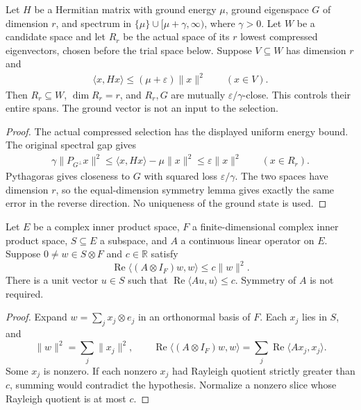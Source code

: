\begin{lemma}
    \label{lem:ritz_ground_space_accuracy}
    \leanok
    Let $H$ be a Hermitian matrix with ground energy $\mu$, ground
    eigenspace $G$ of dimension $r$, and spectrum in
    $\{\mu\}\cup[\mu+\gamma,\infty)$, where $\gamma>0$.
    Let $W$ be a candidate space and let $R_r$ be the actual space of
    its $r$ lowest compressed eigenvectors, chosen before the trial
    space below. Suppose $V\subseteq W$ has dimension $r$ and
    \begin{align}
        \langle x,Hx\rangle\le(\mu+\varepsilon)\|x\|^2
        \qquad(x\in V).
    \end{align}
    Then $R_r\subseteq W$, $\dim R_r=r$, and $R_r,G$ are mutually
    $\varepsilon/\gamma$-close. This controls their entire spans.
    The ground vector is not an input to the selection.
\end{lemma}
\begin{proof}\leanok
    The actual compressed selection has the displayed uniform energy bound.
    The original spectral gap gives
    \begin{align}
        \gamma\|P_{G^\perp}x\|^2
        \le\langle x,Hx\rangle-\mu\|x\|^2
        \le\varepsilon\|x\|^2 \qquad(x\in R_r).
    \end{align}
    Pythagoras gives closeness to $G$ with squared loss
    $\varepsilon/\gamma$. The two spaces have dimension $r$, so the
    equal-dimension symmetry lemma gives exactly the same error in the
    reverse direction. No uniqueness of the ground state is used.
\end{proof}


\begin{lemma}
    \label{lem:tensor_local_energy_witness}
    \leanok
    Let $E$ be a complex inner product space, $F$ a finite-dimensional
    complex inner product space, $S\subseteq E$ a subspace, and $A$ a
    continuous linear operator on $E$. Suppose $0\ne w\in S\otimes F$
    and $c\in\mathbb R$ satisfy
    \[
        \operatorname{Re}\langle(A\otimes I_F)w,w\rangle
        \le c\|w\|^2.
    \]
    There is a unit vector $u\in S$ such that
    $\operatorname{Re}\langle Au,u\rangle\le c$.
    Symmetry of $A$ is not required.
\end{lemma}
\begin{proof}\leanok
    Expand $w=\sum_jx_j\otimes e_j$ in an orthonormal basis of $F$.
    Each $x_j$ lies in $S$, and
    \[
        \|w\|^2=\sum_j\|x_j\|^2,\qquad
        \operatorname{Re}\langle(A\otimes I_F)w,w\rangle
        =\sum_j\operatorname{Re}\langle Ax_j,x_j\rangle.
    \]
    Some $x_j$ is nonzero. If each nonzero $x_j$ had Rayleigh quotient
    strictly greater than $c$, summing would contradict the hypothesis.
    Normalize a nonzero slice whose Rayleigh quotient is at most $c$.
\end{proof}


